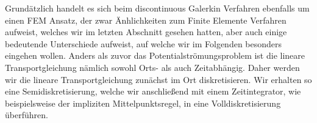 Grundätzlich handelt es sich beim discontinuous Galerkin Verfahren ebenfalls um einen FEM Ansatz, der zwar Änhlichkeiten zum Finite Elemente Verfahren aufweist, welches wir im letzten Abschnitt gesehen hatten, aber auch einige bedeutende Unterschiede aufweist, auf welche wir im Folgenden besonders eingehen wollen. 
Anders als zuvor das Potentialströmungsproblem ist die lineare Transportgleichung  nämlich sowohl Orts- als auch Zeitabhängig. Daher werden wir
  die lineare Transportgleichung zunächst im Ort diskretisieren. Wir erhalten so eine Semidiskretisierung, welche wir anschließend mit einem Zeitintegrator, wie beispielsweise der impliziten Mittelpunktsregel, in eine Volldiskretisierung überführen.
 

